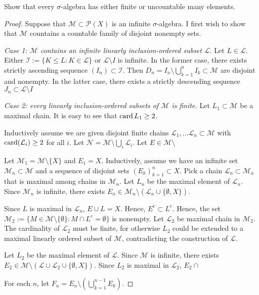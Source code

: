 \documentclass{article}
\begin{document}
 Show that every $\sigma$-algebra has either finite or uncountable many elements.
\begin{proof}
Suppose that $\mathcal M \subset \mathcal P (X)$ is an infinite $\sigma$-algebra.  I first wish to show that $\mathcal M$ countains a countable family of disjoint nonempty sets.

\emph{Case 1: $\mathcal M$ contains an infinite linearly inclusion-ordered subset $\mathcal L$}.  Let $L \in \mathcal L$. Either $\mathcal I := \{K \le L : K \in \mathcal L\}$ or $\mathcal L \setminus I$ is infinite.  In the former case, there exists strictly ascending sequence $(I_n) \subset \mathcal I$.  Then $D_n = I_n \setminus \bigcup_{k=1}^n I_k \subset \mathcal M$ are disjoint and nonempty. In the latter case, there exists a strictly descending sequence $J_n \subset \mathcal L \setminus I$

\emph{Case 2: every linearly inclusion-ordered subsets of $\mathcal M$ is finite.}  Let $L_1 \subset \mathcal M$ be a maximal chain.  It is easy to see that $\operatorname{card} L_1 \ge 2$.

Inductively assume we are given disjoint finite chains $\mathcal L_1, \ldots \mathcal L_n \subset \mathcal M$ with $\operatorname{card} (\mathcal L_i) \ge 2$ for all $i$. Let $\mathcal N = \mathcal M \setminus \bigcup_i \mathcal L_i$. Let $E \in \mathcal M \setminus$


 Let $\mathcal M_1 = \mathcal M \setminus \{X\}$ and $E_1 = X$. Inductively, assume we have an infinite set $\mathcal M_n \subset \mathcal M$ and a sequence of disjoint sets $(E_k)_{k=1}^n \subset X$. Pick a chain $\mathcal L_n \subset \mathcal M_n$ that is maximal among chains in $\mathcal M_n$.  Let $L_n$ be the maximal element of $\mathcal L_n$.  Since $\mathcal M_n$ is infinite, there exists $E_n \in \mathcal M_n \setminus (\mathcal L_n \cup \{\emptyset, X\})$. 

 Since $L$ is maximal in $\mathcal L_n$, $E \cup L = X$. Hence, $E^c \subset L^c$.   Hence, the set $\mathcal M_2 := \{M \in \mathcal M \setminus \{ \emptyset \} : M \cap L^c = \emptyset \}$ is nonempty.  Let $\mathcal L_2$ be maximal chain in $\mathcal M_2$.  The cardinality of $\mathcal L_2$ must be finite, for otherwise $L_2$ could be extended to a maximal linearly ordered subset of $\mathcal M$, contradicting the construction of $\mathcal L$.

Let $L_2$ be the maximal element of $\mathcal L$.  Since $\mathcal M$ is infinite, there exists $E_2 \in \mathcal M \setminus (\mathcal L \cup \mathcal L_2 \cup \{\emptyset, X\})$. Since $L_2$ is maximal in $\mathcal L_2$, $E_2 \cap $

 For each $n$, let $F_n = E_n \setminus \left( \bigcup_{k=1}^{n-1} E_k \right)$. 

\end{proof}
\end{document}
